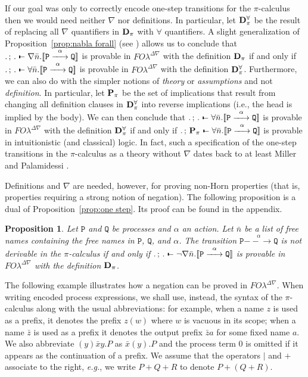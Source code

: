 \documentclass{acmtrans2m}
\newtheorem{proposition}[theorem]{Proposition}
\def\Ppi{{\mathtt P}}
\def\Qpi{{\mathtt Q}}
\def\relbar{\mathrel{\smash-}}
\def\joinrelm{\mathrel{\mkern-3.2mu}}
\def\tailpiece{\kern 1pt\vrule height 1ex width 0.3ex depth -.25ex}
\def\seqsym{\mathrel{\tailpiece\joinrelm\relbar}}
\newcommand{\FOL   }{FO\lambda}
\newcommand{\FOLDNb}{\FOL^{\Delta\nabla}}
\newcommand{\NSeq}[3]{#1\,;\,#2 \seqsym #3}
\newcommand{\one  }[3]{#1\stackrel{#2}{-\!\!-\!\!\!\rightarrow    } #3}
\newcommand{\trans}[1]{[\![ #1 ]\!]}
\begin{document}
If our goal was only to correctly encode one-step transitions for the
$\pi$-calculus then we would need neither $\nabla$ nor definitions.
In particular, let ${\bf D}^\forall_\pi$ be the result of replacing
all $\nabla$ quantifiers in ${\bf D}_\pi$ with $\forall$ quantifiers.
A slight generalization of Proposition~\ref{prop:nabla forall} (see
\cite{miller05tocl,tiu04phd}) allows us to conclude that
$\NSeq{.}{.}{\nabla \bar{n}.\trans{\one{\Ppi}{\alpha}{\Qpi}}}$ is provable 
in $\FOLDNb$ with the definition ${\bf D}_\pi$ if and only if
$\NSeq{.}{.}{\forall \bar{n}.\trans{\one{\Ppi}{\alpha}{\Qpi}}}$ is provable 
in $\FOLDNb$ with the definition ${\bf D}^\forall_\pi$.  Furthermore, we
can also do with the simpler notions of {\em theory} or {\em
assumptions} and not {\em definition}.  In particular, let ${\bf
P}_\pi$ be the set of implications that result from changing all
definition clauses in ${\bf D}^\forall_\pi$ into reverse implications
(i.e., the head is implied by the body).  We can then conclude that
$\NSeq{.}{.}{\forall \bar{n}.\trans{\one{\Ppi}{\alpha}{\Qpi}}}$ is provable 
in $\FOLDNb$ with the definition ${\bf D}^\forall_\pi$ if and only if 
$\NSeq{.}{{\bf P}_\pi}{\forall \bar{n}.\trans{\one{\Ppi}{\alpha}{\Qpi}}}$ 
is provable in intuitionistic (and classical) logic.  In fact, such a specification 
of the one-step transitions in the $\pi$-calculus as a theory without $\nabla$ dates
back to at least Miller and Palamidessi \citeyear{miller99surveys}.


Definitions and $\nabla$ are needed, however, for proving non-Horn
properties (that is, properties requiring a strong notion of
negation).  The following proposition is a dual of
Proposition~\ref{prop:one step}. Its proof can be found in the appendix.

\begin{proposition}
\label{prop:neg one step}
Let $\Ppi$ and $\Qpi$ be processes and $\alpha$ an action.   Let $\bar{n}$ be
a list of free names containing the free names in $\Ppi$, $\Qpi$, and $\alpha$.
The transition $\one{\Ppi}{\alpha}{\Qpi}$ is not derivable in the $\pi$-calculus if and only
if $\NSeq{.}{.}{\lnot\nabla \bar{n}.\trans{\one{\Ppi}{\alpha}{\Qpi}}}$ is provable 
in $\FOLDNb$ with the definition ${\bf D}_\pi$.
\end{proposition}


The following example illustrates how a negation can be proved in
$\FOLDNb$.  When writing encoded process expressions, we shall use,
instead, the syntax of the $\pi$-calculus along with the usual
abbreviations: for example, when a name $z$ is used as a prefix, it
denotes the prefix $z(w)$ where $w$ is vacuous in its scope; when a
name $\bar{z}$ is used as a prefix it denotes the output prefix
$\bar{z}a$ for some fixed name $a$.  We also abbreviate
$(y)\bar{x}y.P$ as $\bar{x}(y).P$ and the process term $0$ is omitted
if it appears as the continuation of a prefix. We assume that the
operators $|$ and $+$ associate to the right, {\em e.g.}, we write $P + Q + R$
to denote $P + (Q + R)$.
\end{document}
